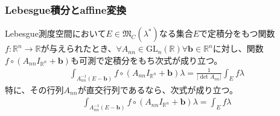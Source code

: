 \documentclass[dvipdfmx]{jsarticle}
\begin{document}
\subsubsection{Lebesgue積分とaffine変換}%
\begin{thm}\label{4.6.6.3}
Lebesgue測度空間において$E \in \mathfrak{M}_{C}\left( \lambda^{*} \right)$なる集合$E$で定積分をもつ関数$f:\mathbb{R}^{n} \rightarrow \mathbb{R}$が与えられたとき、$\forall A_{nn} \in \mathrm{GL}_{n}\left( \mathbb{R} \right)\forall\mathbf{b} \in \mathbb{R}^{n}$に対し、関数$f \circ \left( A_{nn}I_{\mathbb{R}^{n}} + \mathbf{b} \right)$も可測で定積分をもち次式が成り立つ。
\begin{align*}
\int_{A_{nn}^{- 1}\left( E - \mathbf{b} \right)} {f \circ \left( A_{nn}I_{\mathbb{R}^{n}} + \mathbf{b} \right)\lambda} = \frac{1}{\left| \det A_{nn} \right|}\int_{E} {f\lambda}
\end{align*}
特に、その行列$A_{nn}$が直交行列であるなら、次式が成り立つ。
\begin{align*}
\int_{A_{nn}^{- 1}\left( E - \mathbf{b} \right)} {f \circ \left( A_{nn}I_{\mathbb{R}^{n}} + \mathbf{b} \right)\lambda} = \int_{E} {f\lambda}
\end{align*}
\end{thm}
\end{document}
